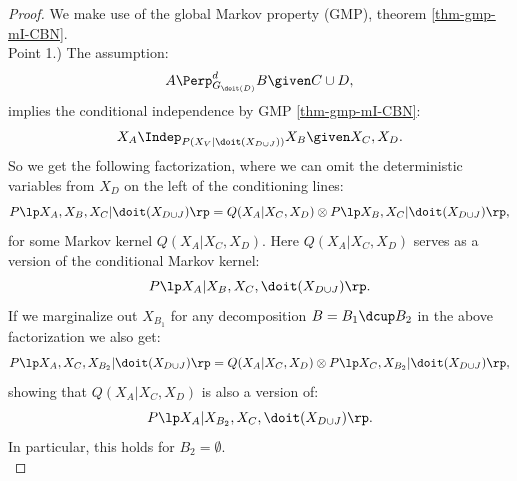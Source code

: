\begin{Cor}[Do-calculus]
\begin{enumerate}

    \end{enumerate}
\begin{proof}
    We make use of the global Markov property (GMP), theorem \ref{thm-gmp-mI-CBN}.\\

Point 1.) The assumption:
            \[ A \Perp^d_{G_{\doit(D)}} B \given C \cup D,   \]
implies the conditional independence by GMP \ref{thm-gmp-mI-CBN}:
  \[ X_A \Indep_{P(X_V|\doit(X_{D\cup J}))} X_B \given X_C,X_D.\]
So  we get the following factorization, where we can omit the deterministic variables from $X_D$ on the left of the conditioning lines:
  \[ P\lp X_A,X_B,X_C|\doit(X_{D\cup J})\rp = Q(X_A|X_C,X_D) \otimes P\lp X_B,X_C|\doit(X_{D\cup J})\rp,\]
for some Markov kernel $Q(X_A|X_C,X_D)$. Here
$Q(X_A|X_C,X_D)$ serves as a version of the conditional Markov kernel:
  \[P\lp X_A|X_B,X_C,\doit(X_{D\cup J})\rp.\]
If we marginalize out $X_{B_1}$ for any decomposition $B=B_1 \dcup B_2$ 
in the above factorization we also get:
  \[ P\lp X_A,X_C,X_{B_2}|\doit(X_{D\cup J})\rp = Q(X_A|X_C,X_D) \otimes P\lp X_C,X_{B_2}|\doit(X_{D\cup J})\rp,\]
showing that $Q(X_A|X_C,X_D)$ is also a version of:
  \[P\lp X_A|X_{B_2},X_C,\doit(X_{D\cup J})\rp.\]
In particular, this holds for $B_2 = \emptyset$.\\


\end{proof}
\end{Cor}
